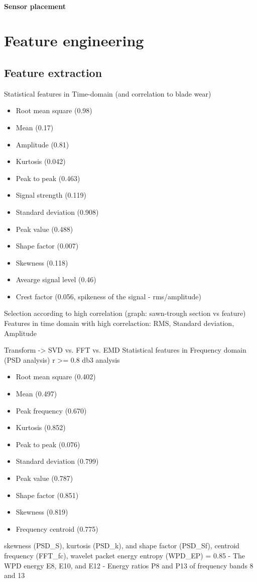 \paragraph{Sensor placement}










\section{Feature engineering}
\subsection{Feature extraction}
Statistical features in Time-domain (and correlation to blade wear) \cite{zhuo_research_2022} \cite{zheng_feature_2018}
\begin{itemize}
	\item 	Root mean square (0.98)
	\item Mean (0.17)
	\item Amplitude (0.81)
	\item Kurtosis (0.042)
	\item Peak to peak (0.463)
	\item Signal strength (0.119)
	\item Standard deviation (0.908)
	\item Peak value (0.488)
	\item Shape factor (0.007)
	\item Skewness (0.118)
	\item Avearge signal level (0.46)
	\item Crest factor (0.056, spikeness of the signal - rms/amplitude)
\end{itemize}
Selection according to high correlation (graph: sawn-trough section vs feature)
Features in time domain with high correlaction: RMS, Standard deviation, Amplitude


Transform -> SVD vs. FFT vs. EMD
Statistical features in Frequency domain (PSD analysis) r >= 0.8 db3 analysis
\begin{itemize}
	\item 	Root mean square (0.402)
	\item Mean (0.497)
	\item Peak frequency (0.670)
	\item Kurtosis (0.852)
	\item Peak to peak (0.076)
	\item Standard deviation (0.799)
	\item Peak value (0.787)
	\item Shape factor (0.851)
	\item Skewness (0.819)
	\item Frequency centroid (0.775)
\end{itemize}
skewness (PSD\_S), kurtosis (PSD\_k), and shape factor (PSD\_Sf),
centroid frequency (FFT\_fc), wavelet packet energy entropy (WPD\_EP) = 0.85
- The WPD energy E8, E10, and E12
- Energy ratios P8 and P13 of frequency bands 8 and 13

